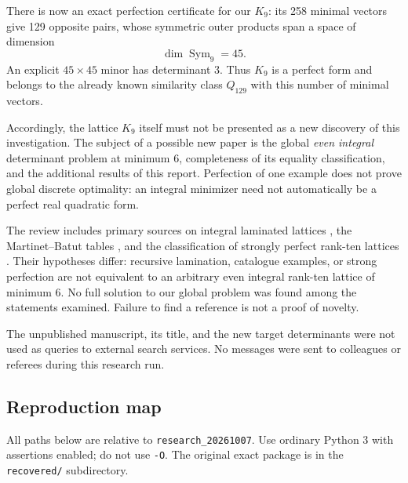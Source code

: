 \documentclass[11pt,a4paper]{article}
\theoremstyle{remark}\newtheorem{remark}[theorem]{Remark}
\newcommand{\file}[1]{{\small\nolinkurl{#1}}}
\begin{document}
There is now an exact perfection certificate for our $K_9$: its 258 minimal vectors give 129 opposite pairs, whose symmetric outer products span a space of dimension
\[
\dim\operatorname{Sym}_9=45.
\]
An explicit $45\times45$ minor has determinant 3. Thus $K_9$ is a perfect form and belongs to the already known similarity class $Q_{129}$ with this number of minimal vectors.

Accordingly, the lattice $K_9$ itself must not be presented as a new discovery of this investigation. The subject of a possible new paper is the global \emph{even integral} determinant problem at minimum 6, completeness of its equality classification, and the additional results of this report. Perfection of one example does not prove global discrete optimality: an integral minimizer need not automatically be a perfect real quadratic form.

The review includes primary sources on integral laminated lattices \cite{cs,pp}, the Martinet--Batut tables \cite{martinet}, and the classification of strongly perfect rank-ten lattices \cite{nv}. Their hypotheses differ: recursive lamination, catalogue examples, or strong perfection are not equivalent to an arbitrary even integral rank-ten lattice of minimum 6. No full solution to our global problem was found among the statements examined. Failure to find a reference is not a proof of novelty.

The unpublished manuscript, its title, and the new target determinants were not used as queries to external search services. No messages were sent to colleagues or referees during this research run.

\Needspace{12cm}
\subsection{Reproduction map}

All paths below are relative to \file{research_20261007}. Use ordinary Python 3 with assertions enabled; do not use \texttt{-O}. The original exact package is in the \file{recovered/} subdirectory.
\end{document}
